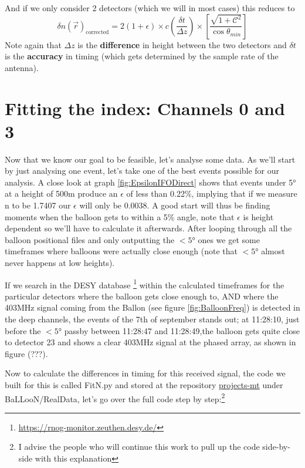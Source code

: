 \documentclass[11pt,a4paper,faculty=we,language=en,doctype=report]{cls/ugent-doc}
\begin{document}
And if we only consider 2 detectors (which we will in most cases) this reduces
to
\begin{equation}
	\delta n(\vec{r})_{\text{corrected}} = 2(1+\epsilon)\times c\left(\frac{\delta t}{\Delta z}\right) \times\left[\frac{\sqrt{1 +
	\mathcal{C}^2}}{\cos{\theta_{min}}}\right]
\end{equation}
Note again that $\Delta z$ is the \textbf{difference} in height between the two
detectors and $\delta t$ is the \textbf{accuracy} in timing (which gets
determined by the sample rate of the antenna).

\newpage
\section{Fitting the index: Channels 0 and 3}
Now that we know our goal to be feasible, let's analyse some data.  As we'll
start by just analysing one event, let's take one of the best events possible
for our analysis.  A close look at graph \ref{fig:EpsilonIFODirect} shows that
events under 5° at a height of 500m produce an $\epsilon$ of less than 0.22\%,
implying that if we measure n to be 1.7407 our $\epsilon$ will only be 0.0038.
A good start will thus be finding moments when the balloon gets to within a 5\%
angle, note that $\epsilon$ is height dependent so we'll have to calculate it
afterwards.  After looping through all the balloon positional files and only
outputting the $<5°$ ones we get some timeframes where balloons were actually
close enough (note that $<5°$ almost never happens at low heights).

If we search in the DESY database
\footnote{\url{https://rnog-monitor.zeuthen.desy.de/}} within the calculated
timeframes for the particular detectors where the balloon gets close enough to,
AND where the 403MHz signal coming from the Ballon (see figure
\ref{fig:BalloonFreq}) is detected in the deep channels, the events of the 7th
of september stands out; at 11:28:10,  just before the $<5°$ passby between
11:28:47 and 11:28:49,the balloon gets quite close to detector 23 and shows a
clear 403MHz signal at the phased array, as shown in figure (???).

Now to calculate the differences in timing for this received signal, the code
we built for this is called FitN.py and stored at the repository
\href{https://github.com/arthuradriaens-code/projects-mt.git}{projects-mt}
under BaLLooN/RealData, let's go over the full code step by step:\footnote{I advise 
the people who will continue this work to pull up the code side-by-side with this 
explanation}
\end{document}
